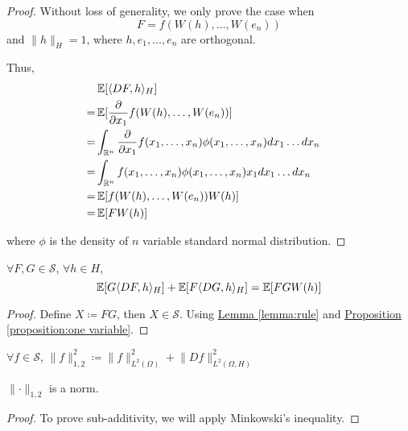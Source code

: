 \begin{proof}
Without loss of generality, we only prove the case 
when 
\[F = f(W(h), \dots, W(e_n))\] 
and $\lVert h \rVert_{H} = 1$, 
where $h, e_1, \dots, e_n$ are orthogonal. 

Thus, 
\begin{equation*}
\begin{aligned}
&\operatorname{\mathbb{E}}[\langle DF, h \rangle_{H}]  \\
= &\operatorname{\mathbb{E}}[\frac{\partial}{\partial x_1} f(W(h), \dots, W(e_n))]
&\text{} \\
= &\int_{\mathbb{R}^n} \frac{\partial}{\partial x_1} f(x_1, \dots, x_n) \phi(x_1, \dots, x_n) d x_1\dots d x_n 
&\text{} \\
= &\int_{\mathbb{R}^n} f(x_1, \dots, x_n) \phi(x_1, \dots, x_n) x_1 d x_1\dots d x_n 
&\text{} \\
= &\operatorname{\mathbb{E}}[f(W(h), \dots, W(e_n))W(h)]
&\text{} \\
= &\operatorname{\mathbb{E}}[FW(h)]
&\text{} \\
\end{aligned}
\end{equation*}

where $\phi$ is the density of $n$ variable standard normal distribution.
\end{proof}

\begin{proposition}
\label{proposition:2 terms}
$\forall F, G \in \mathcal{S}$, $\forall h \in H$, 
\[\operatorname{\mathbb{E}}[G \langle DF, h \rangle_{H}] 
+  \operatorname{\mathbb{E}}[F \langle DG, h \rangle_{H}] 
= \operatorname{\mathbb{E}}[FGW(h)]\]
\end{proposition}

\begin{proof}
Define $X \coloneqq FG$, then $X \in \mathcal{S}$. 
Using \hyperref[lemma:rule]
{Lemma \ref*{lemma:rule}}
and 
\hyperref[proposition:one variable]
{Proposition \ref*{proposition:one variable}}. 
\end{proof}

\begin{notation}
$\forall f \in \mathcal{S}$, 
$\lVert f \rVert_{1, 2}^2 \coloneqq 
\lVert f \rVert_{L^2(\Omega)}^2
+ \lVert Df \rVert_{L^2(\Omega, H)}^2$
\end{notation}

\begin{proposition}
\label{proposition:Soblev norm}
$\lVert \cdot \rVert_{1, 2}$ is a norm. 
\end{proposition}

\begin{proof}
To prove sub-additivity, we will apply Minkowski's inequality. 
\end{proof}


